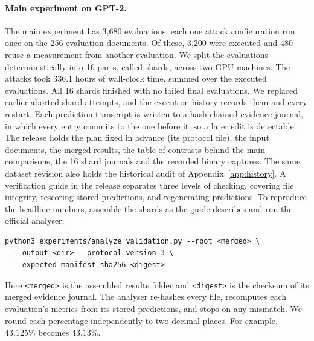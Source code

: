\documentclass[11pt]{article}
\begin{document}
\paragraph{Main experiment on GPT-2.}
The main experiment has 3{,}680 evaluations, each one attack configuration run once on the 256 evaluation documents. Of these, 3{,}200 were executed and 480 reuse a measurement from another evaluation. We split the evaluations deterministically into 16 parts, called shards, across two GPU machines. The attacks took 336.1 hours of wall-clock time, summed over the executed evaluations. All 16 shards finished with no failed final evaluations. We replaced earlier aborted shard attempts, and the execution history records them and every restart. Each prediction transcript is written to a hash-chained evidence journal, in which every entry commits to the one before it, so a later edit is detectable. The release holds the plan fixed in advance (its protocol file), the input documents, the merged results, the table of contrasts behind the main comparisons, the 16 shard journals and the recorded binary captures. The same dataset revision also holds the historical audit of Appendix~\ref{app:history}. A verification guide in the release separates three levels of checking, covering file integrity, rescoring stored predictions, and regenerating predictions. To reproduce the headline numbers, assemble the shards as the guide describes and run the official analyser:
\begin{verbatim}
python3 experiments/analyze_validation.py --root <merged> \
  --output <dir> --protocol-version 3 \
  --expected-manifest-sha256 <digest>
\end{verbatim}
Here \texttt{<merged>} is the assembled results folder and \texttt{<digest>} is the checksum of its merged evidence journal. The analyser re-hashes every file, recomputes each evaluation's metrics from its stored predictions, and stops on any mismatch. We round each percentage independently to two decimal places. For example, $43.125\%$ becomes $43.13\%$.
\end{document}
